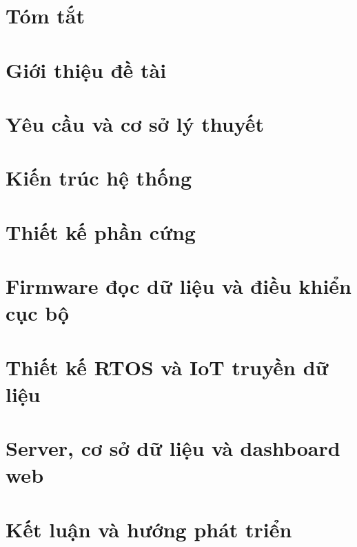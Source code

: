 \documentclass[a4paper,12pt]{report}
\begin{document}


\clearpage
{}
\chapter*{Tóm tắt}


\clearpage
\tableofcontents

\clearpage
{}
\setcounter{page}{1}

\chapter{Giới thiệu đề tài}


\chapter{Yêu cầu và cơ sở lý thuyết}


\chapter{Kiến trúc hệ thống}


\chapter{Thiết kế phần cứng}


\chapter{Firmware đọc dữ liệu và điều khiển cục bộ}


\chapter{Thiết kế RTOS và IoT truyền dữ liệu}


\chapter{Server, cơ sở dữ liệu và dashboard web}


\chapter{Kết luận và hướng phát triển}



\end{document}
